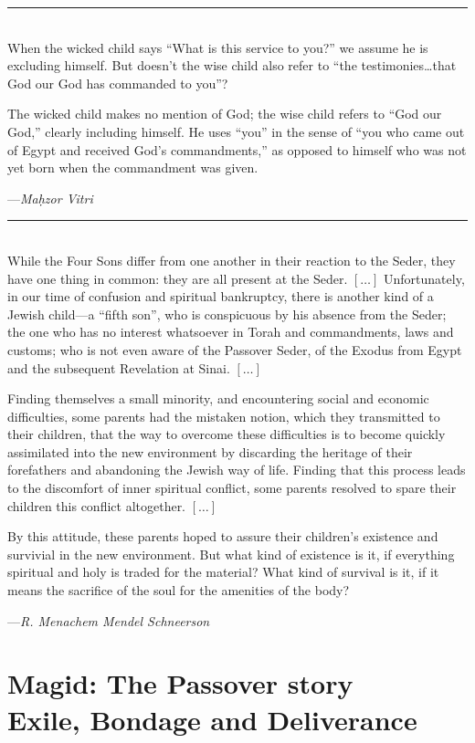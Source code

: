 \documentclass[a4paper,10pt,openany]{memoir}
\newcommand{\HgEllipsis}{\ensuremath{\left[\ldots\right]}}
\newcommand{\HgSource}[1]{\hfill{\small---\itshape{#1}}}
\newcommand{\HgFill}{\vfill \hrule \vfill}
\newenvironment{HgEnglish}{\strut\\\noindent}{\vspace{1em}}
\newcommand{\LSrc}{\textsuperscript{\upshape{[L]}}}
\begin{document}
\HgFill

\begin{HgEnglish}
  When the wicked child says “What is this service to you?” we assume he is
  excluding himself. But doesn’t the wise child also refer to “the
  testimonies\ldots{}that God our God has commanded to you”?

  The wicked child makes no mention of God; the wise child refers to “God our
  God,” clearly including himself. He uses “you” in the sense of “you who came
  out of Egypt and received God’s commandments,” as opposed to himself who was
  not yet born when the commandment was given.

  \HgSource{Ma\d{h}zor Vitri \LSrc}
\end{HgEnglish}

\HgFill

\begin{HgEnglish}
  While the Four Sons differ from one another in their reaction to the Seder,
  they have one thing in common: they are all present at the Seder.
  \HgEllipsis{} Unfortunately, in our time of confusion and spiritual
  bankruptcy, there is another kind of a Jewish child---a ``fifth son'', who is
  conspicuous by his absence from the Seder; the one who has no interest
  whatsoever in Torah and commandments, laws and customs; who is not even aware
  of the Passover Seder, of the Exodus from Egypt and the subsequent Revelation
  at Sinai. \HgEllipsis

  Finding themselves a small minority, and encountering social and economic
  difficulties, some parents had the mistaken notion, which they transmitted to
  their children, that the way to overcome these difficulties is to become
  quickly assimilated into the new environment by discarding the heritage of
  their forefathers and abandoning the Jewish way of life. Finding that this
  process leads to the discomfort of inner spiritual conflict, some parents
  resolved to spare their children this conflict altogether. \HgEllipsis

  By this attitude, these parents hoped to assure their children's existence and
  survivial in the new environment. But what kind of existence is it, if
  everything spiritual and holy is traded for the material? What kind of
  survival is it, if it means the sacrifice of the soul for the amenities of the
  body?

  \HgSource{R. Menachem Mendel Schneerson}
\end{HgEnglish}


\chapter*{Magid: The Passover story \\ {\LARGE Exile, Bondage and Deliverance}}
\end{document}
